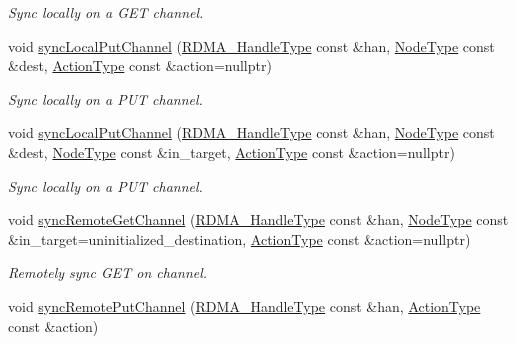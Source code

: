 \begin{DoxyCompactItemize}
\begin{DoxyCompactList}\small\item\em Sync locally on a G\+ET channel. \end{DoxyCompactList}\item 
void \hyperlink{structvt_1_1rdma_1_1_r_d_m_a_manager_ad09037e1408af7037ca87fc4708700aa}{sync\+Local\+Put\+Channel} (\hyperlink{namespacevt_a10442579ec4e7ebef223818e64bcf908}{R\+D\+M\+A\+\_\+\+Handle\+Type} const \&han, \hyperlink{namespacevt_a866da9d0efc19c0a1ce79e9e492f47e2}{Node\+Type} const \&dest, \hyperlink{namespacevt_ae0a5a7b18cc99d7b732cb4d44f46b0f3}{Action\+Type} const \&action=nullptr)
\begin{DoxyCompactList}\small\item\em Sync locally on a P\+UT channel. \end{DoxyCompactList}\item 
void \hyperlink{structvt_1_1rdma_1_1_r_d_m_a_manager_a3b4e56f84f35786f8225baffeaa921ea}{sync\+Local\+Put\+Channel} (\hyperlink{namespacevt_a10442579ec4e7ebef223818e64bcf908}{R\+D\+M\+A\+\_\+\+Handle\+Type} const \&han, \hyperlink{namespacevt_a866da9d0efc19c0a1ce79e9e492f47e2}{Node\+Type} const \&dest, \hyperlink{namespacevt_a866da9d0efc19c0a1ce79e9e492f47e2}{Node\+Type} const \&in\+\_\+target, \hyperlink{namespacevt_ae0a5a7b18cc99d7b732cb4d44f46b0f3}{Action\+Type} const \&action=nullptr)
\begin{DoxyCompactList}\small\item\em Sync locally on a P\+UT channel. \end{DoxyCompactList}\item 
void \hyperlink{structvt_1_1rdma_1_1_r_d_m_a_manager_afaa2ab82b754c4a231c3d728fe0a9e88}{sync\+Remote\+Get\+Channel} (\hyperlink{namespacevt_a10442579ec4e7ebef223818e64bcf908}{R\+D\+M\+A\+\_\+\+Handle\+Type} const \&han, \hyperlink{namespacevt_a866da9d0efc19c0a1ce79e9e492f47e2}{Node\+Type} const \&in\+\_\+target=uninitialized\+\_\+destination, \hyperlink{namespacevt_ae0a5a7b18cc99d7b732cb4d44f46b0f3}{Action\+Type} const \&action=nullptr)
\begin{DoxyCompactList}\small\item\em Remotely sync G\+ET on channel. \end{DoxyCompactList}\item 
void \hyperlink{structvt_1_1rdma_1_1_r_d_m_a_manager_a9b6fb7fac7c6b534659705cf4ad20658}{sync\+Remote\+Put\+Channel} (\hyperlink{namespacevt_a10442579ec4e7ebef223818e64bcf908}{R\+D\+M\+A\+\_\+\+Handle\+Type} const \&han, \hyperlink{namespacevt_ae0a5a7b18cc99d7b732cb4d44f46b0f3}{Action\+Type} const \&action)

\end{DoxyCompactItemize}
